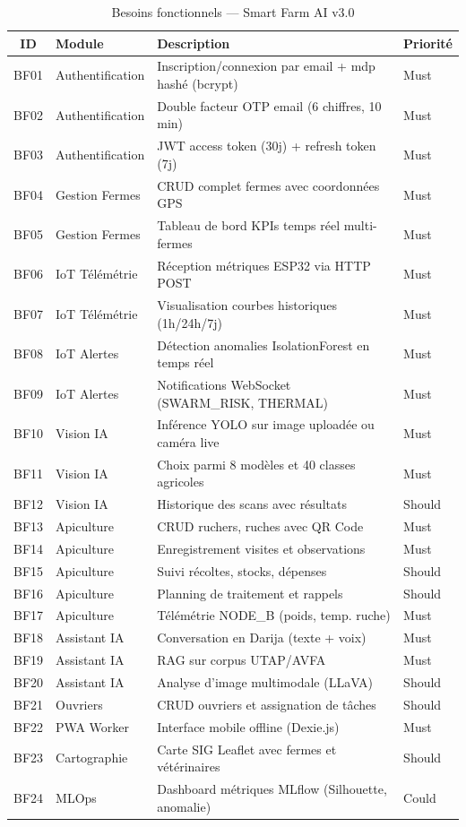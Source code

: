 \begin{table}[H]\centering
\caption{Besoins fonctionnels — Smart Farm AI v3.0}
\label{tab:bf_all}
\small
\begin{tabular}{cp{4.5cm}p{6.5cm}l}
\toprule
\textbf{ID} & \textbf{Module} & \textbf{Description} & \textbf{Priorité} \\
\midrule
BF01 & Authentification & Inscription/connexion par email + mdp hashé (bcrypt) & Must \\
BF02 & Authentification & Double facteur OTP email (6 chiffres, 10 min) & Must \\
BF03 & Authentification & JWT access token (30j) + refresh token (7j) & Must \\
BF04 & Gestion Fermes   & CRUD complet fermes avec coordonnées GPS & Must \\
BF05 & Gestion Fermes   & Tableau de bord KPIs temps réel multi-fermes & Must \\
BF06 & IoT Télémétrie   & Réception métriques ESP32 via HTTP POST & Must \\
BF07 & IoT Télémétrie   & Visualisation courbes historiques (1h/24h/7j) & Must \\
BF08 & IoT Alertes      & Détection anomalies IsolationForest en temps réel & Must \\
BF09 & IoT Alertes      & Notifications WebSocket (SWARM\_RISK, THERMAL) & Must \\
BF10 & Vision IA        & Inférence YOLO sur image uploadée ou caméra live & Must \\
BF11 & Vision IA        & Choix parmi 8 modèles et 40 classes agricoles & Must \\
BF12 & Vision IA        & Historique des scans avec résultats & Should \\
BF13 & Apiculture       & CRUD ruchers, ruches avec QR Code & Must \\
BF14 & Apiculture       & Enregistrement visites et observations & Must \\
BF15 & Apiculture       & Suivi récoltes, stocks, dépenses & Should \\
BF16 & Apiculture       & Planning de traitement et rappels & Should \\
BF17 & Apiculture       & Télémétrie NODE\_B (poids, temp. ruche) & Must \\
BF18 & Assistant IA     & Conversation en Darija (texte + voix) & Must \\
BF19 & Assistant IA     & RAG sur corpus UTAP/AVFA & Must \\
BF20 & Assistant IA     & Analyse d'image multimodale (LLaVA) & Should \\
BF21 & Ouvriers         & CRUD ouvriers et assignation de tâches & Should \\
BF22 & PWA Worker       & Interface mobile offline (Dexie.js) & Must \\
BF23 & Cartographie     & Carte SIG Leaflet avec fermes et vétérinaires & Should \\
BF24 & MLOps            & Dashboard métriques MLflow (Silhouette, anomalie) & Could \\
\bottomrule
\end{tabular}
\end{table}

